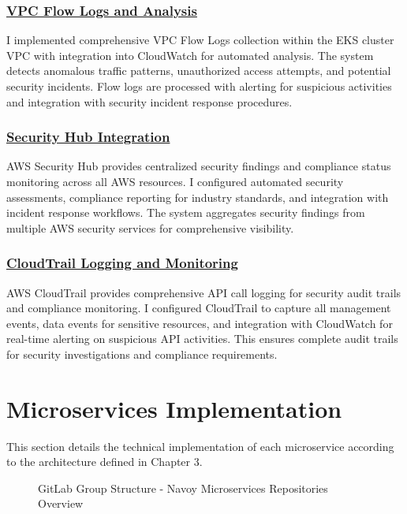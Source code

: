 \subsubsection*{\underline{VPC Flow Logs and Analysis}}
I implemented comprehensive VPC Flow Logs collection within the EKS cluster VPC with integration into CloudWatch for automated analysis. The system detects anomalous traffic patterns, unauthorized access attempts, and potential security incidents. Flow logs are processed with alerting for suspicious activities and integration with security incident response procedures.

\subsubsection*{\underline{Security Hub Integration}}
AWS Security Hub provides centralized security findings and compliance status monitoring across all AWS resources. I configured automated security assessments, compliance reporting for industry standards, and integration with incident response workflows. The system aggregates security findings from multiple AWS security services for comprehensive visibility.

\subsubsection*{\underline{CloudTrail Logging and Monitoring}}
AWS CloudTrail provides comprehensive API call logging for security audit trails and compliance monitoring. I configured CloudTrail to capture all management events, data events for sensitive resources, and integration with CloudWatch for real-time alerting on suspicious API activities. This ensures complete audit trails for security investigations and compliance requirements.

\section{Microservices Implementation}
This section details the technical implementation of each microservice according to the architecture defined in Chapter 3.

\begin{figure}[H]
    \centering
    \caption{GitLab Group Structure - Navoy Microservices Repositories Overview}
    \label{fig:gitlab-navoy-group}
\end{figure}


